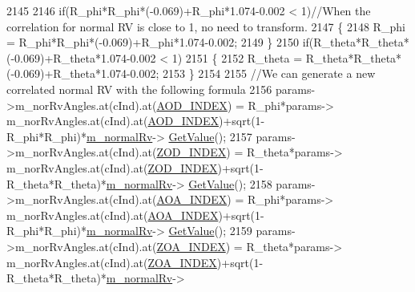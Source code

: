 \begin{DoxyCode}
2145 
2146                                 \textcolor{keywordflow}{if}(R\_phi*R\_phi*(-0.069)+R\_phi*1.074-0.002 < 1)\textcolor{comment}{//When the correlation for
       normal RV is close to 1, no need to transform.}
2147                                 \{
2148                                         R\_phi = R\_phi*R\_phi*(-0.069)+R\_phi*1.074-0.002;
2149                                 \}
2150                                 \textcolor{keywordflow}{if}(R\_theta*R\_theta*(-0.069)+R\_theta*1.074-0.002 < 1)
2151                                 \{
2152                                         R\_theta = R\_theta*R\_theta*(-0.069)+R\_theta*1.074-0.002;
2153                                 \}
2154 
2155                                 \textcolor{comment}{//We can generate a new correlated normal RV with the following formula}
2156                                 params->m\_norRvAngles.at(cInd).at(\hyperlink{mmwave-3gpp-channel_8h_af0ca9ddb9e3346bd827d865de86dc5cb}{AOD\_INDEX}) = R\_phi*params->
      m\_norRvAngles.at(cInd).at(\hyperlink{mmwave-3gpp-channel_8h_af0ca9ddb9e3346bd827d865de86dc5cb}{AOD\_INDEX})+sqrt(1-R\_phi*R\_phi)*\hyperlink{classns3_1_1MmWave3gppChannel_ac2e02ebacc72ed96518d785f2dc87c57}{m\_normalRv}->
      \hyperlink{classns3_1_1NormalRandomVariable_a0134d131477bc439cc6ff7cbe84b03a9}{GetValue}();
2157                                 params->m\_norRvAngles.at(cInd).at(\hyperlink{mmwave-3gpp-channel_8h_ae854b569d54c7f279a42fae34ad464f9}{ZOD\_INDEX}) = R\_theta*params->
      m\_norRvAngles.at(cInd).at(\hyperlink{mmwave-3gpp-channel_8h_ae854b569d54c7f279a42fae34ad464f9}{ZOD\_INDEX})+sqrt(1-R\_theta*R\_theta)*\hyperlink{classns3_1_1MmWave3gppChannel_ac2e02ebacc72ed96518d785f2dc87c57}{m\_normalRv}->
      \hyperlink{classns3_1_1NormalRandomVariable_a0134d131477bc439cc6ff7cbe84b03a9}{GetValue}();
2158                                 params->m\_norRvAngles.at(cInd).at(\hyperlink{mmwave-3gpp-channel_8h_a7f1d5772b72f2ce425d85a2b41e8842f}{AOA\_INDEX}) = R\_phi*params->
      m\_norRvAngles.at(cInd).at(\hyperlink{mmwave-3gpp-channel_8h_a7f1d5772b72f2ce425d85a2b41e8842f}{AOA\_INDEX})+sqrt(1-R\_phi*R\_phi)*\hyperlink{classns3_1_1MmWave3gppChannel_ac2e02ebacc72ed96518d785f2dc87c57}{m\_normalRv}->
      \hyperlink{classns3_1_1NormalRandomVariable_a0134d131477bc439cc6ff7cbe84b03a9}{GetValue}();
2159                                 params->m\_norRvAngles.at(cInd).at(\hyperlink{mmwave-3gpp-channel_8h_a86ab9a21bb66f50f7f4b0c0a0ee1f474}{ZOA\_INDEX}) = R\_theta*params->
      m\_norRvAngles.at(cInd).at(\hyperlink{mmwave-3gpp-channel_8h_a86ab9a21bb66f50f7f4b0c0a0ee1f474}{ZOA\_INDEX})+sqrt(1-R\_theta*R\_theta)*\hyperlink{classns3_1_1MmWave3gppChannel_ac2e02ebacc72ed96518d785f2dc87c57}{m\_normalRv}->

\end{DoxyCode}
